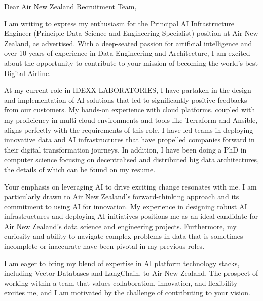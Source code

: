 \documentclass[10pt,a4paper,ragged2e]{altacv}
\begin{document}


\vspace{1em} %

Dear Air New Zealand Recruitment Team,

\vspace{1em} %

I am writing to express my enthusiasm for the Principal AI Infrastructure Engineer (Principle Data Science and Engineering Specialist) position at Air New Zealand, as advertised. With a deep-seated passion for artificial intelligence and over 10 years of experience in Data Engineering and Architecture, I am excited about the opportunity to contribute to your mission of becoming the world's best Digital Airline.

\vspace{1em}

At my current role in IDEXX LABORATORIES, I have partaken in the design and implementation of AI solutions that led to significantly positive feedbacks from our customers. My hands-on experience with cloud platforms, coupled with my proficiency in multi-cloud environments and tools like Terraform and Ansible, aligns perfectly with the requirements of this role. I have led teams in deploying innovative data and AI infrastructures that have propelled companies forward in their digital transformation journeys. In addition, I have been doing a PhD in computer science focusing on decentralised and distributed big data architectures, the details of which can be found on my resume. 

\vspace{1em}

Your emphasis on leveraging AI to drive exciting change resonates with me. I am particularly drawn to Air New Zealand's forward-thinking approach and its commitment to using AI for innovation. My experience in designing robust AI infrastructures and deploying AI initiatives positions me as an ideal candidate for Air New Zealand's data science and engineering projects. Furthermore, my curiosity and ability to navigate complex problems in data that is sometimes incomplete or inaccurate have been pivotal in my previous roles.

\vspace{1em}

I am eager to bring my blend of expertise in AI platform technology stacks, including Vector Databases and LangChain, to Air New Zealand. The prospect of working within a team that values collaboration, innovation, and flexibility excites me, and I am motivated by the challenge of contributing to your vision.
\end{document}
